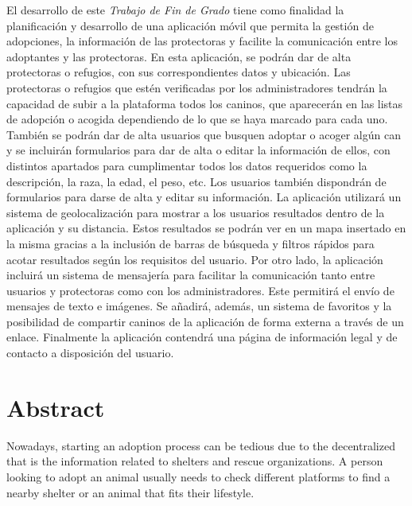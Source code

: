 \documentclass[a4paper, 12pt]{article}
\begin{document}
El desarrollo de este \textit{Trabajo de Fin de Grado} tiene como finalidad la planificación y desarrollo de una aplicación móvil que permita la gestión de adopciones, la información de las protectoras y facilite la comunicación entre los adoptantes y las protectoras. En esta aplicación, se podrán dar de alta protectoras o refugios, con sus correspondientes datos y ubicación. Las protectoras o refugios que estén verificadas por los administradores tendrán la capacidad de subir a la plataforma todos los caninos, que aparecerán en las listas de adopción o acogida dependiendo de lo que se haya marcado para cada uno. También se podrán dar de alta usuarios que busquen adoptar o acoger algún can y se incluirán formularios para dar de alta o editar la información de ellos, con distintos apartados para cumplimentar todos los datos requeridos como la descripción, la raza, la edad, el peso, etc. Los usuarios también dispondrán de formularios para darse de alta y editar su información. La aplicación utilizará un sistema de geolocalización para mostrar a los usuarios resultados dentro de la aplicación y su distancia. Estos resultados se podrán ver en un mapa insertado en la misma gracias a la inclusión de barras de búsqueda y filtros rápidos para acotar resultados según los requisitos del usuario. Por otro lado, la aplicación incluirá un sistema de mensajería para facilitar la comunicación tanto entre usuarios y protectoras como con los administradores. Este permitirá el envío de mensajes de texto e imágenes. Se añadirá, además, un sistema de favoritos y la posibilidad de compartir caninos de la aplicación de forma externa a través de un enlace. Finalmente la aplicación contendrá una página de información legal y de contacto a disposición del usuario.

\newpage
\pagestyle{plain}
\thispagestyle{empty}
\mbox{}

\newpage
\pagestyle{plain}
\section*{Abstract}
Nowadays, starting an adoption process can be tedious due to the decentralized that is the information related to shelters and rescue organizations. A person looking to adopt an animal usually needs to check different platforms to find a nearby shelter or an animal that fits their lifestyle.
\end{document}

